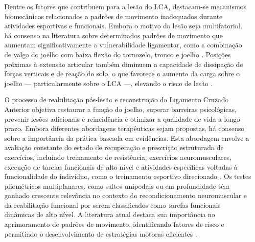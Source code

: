 \documentclass{article}
\begin{document}
Dentre os fatores que contribuem para a lesão do LCA, destacam-se mecanismos biomecânicos relacionados a padrões de movimento inadequados durante atividades esportivas e funcionais. Embora o motivo da lesão seja multifatorial, há consenso na literatura sobre determinados padrões de movimento que aumentam significativamente a vulnerabilidade ligamentar, como a combinação de valgo do joelho com baixa flexão do tornozelo, tronco e joelho \cite{della2020systematic, renstrom2008non, asaeda2024reliability, hewett2005biomechanical, xu2024contribution, leppanen2017sagittal, blackburn2008influence}. Posições próximas à extensão articular também diminuem a capacidade de dissipação de forças verticais e de reação do solo, o que favorece o aumento da carga sobre o joelho — particularmente sobre o LCA —, elevando o risco de lesão \cite{MohammadiOrangi2024}.

O processo de reabilitação pós-lesão e reconstrução do Ligamento Cruzado Anterior objetiva restaurar a função do joelho, superar barreiras psicológicas, prevenir lesões adicionais e reincidência e otimizar a qualidade de vida a longo prazo. Embora diferentes abordagens terapêuticas sejam propostas, há consenso sobre a importância da prática baseada em evidências. Esta abordagem envolve a avaliação constante do estado de recuperação e prescrição estruturada de exercícios, incluindo treinamento de resistência, exercícios neuromusculares, execução de tarefas funcionais de alto nível e atividades específicas voltadas à funcionalidade do indivíduo, como o treinamento esportivo direcionado \cite{filbay2019evidence}. Os testes pliométricos multiplanares, como saltos unipodais ou em profundidade têm ganhado crescente relevância no contexto do recondicionamento neuromuscular e da reabilitação funcional por serem classificados como tarefas funcionais dinâmicas de alto nível. A literatura atual destaca sua importância no aprimoramento de padrões de movimento, identificando fatores de risco e permitindo o desenvolvimento de estratégias motoras eficientes \cite{buckthorpe2021recommendations}.
\end{document}
